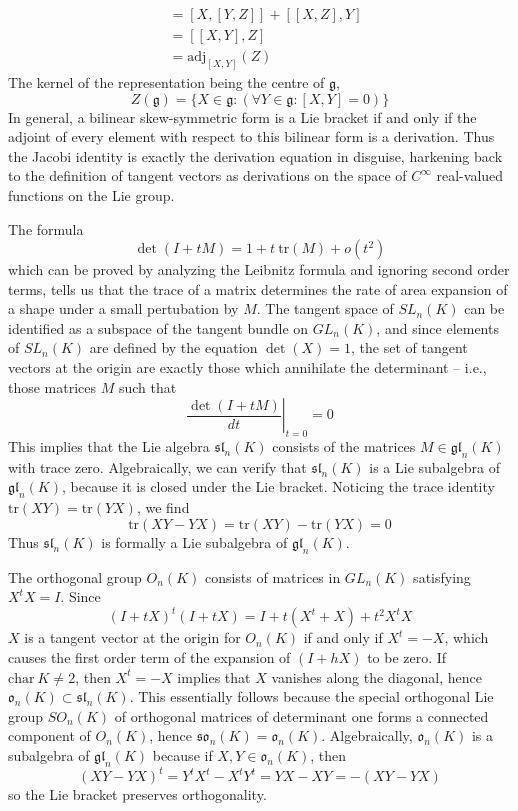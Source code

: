 \begin{example}
\begin{align*}
        &= [X,[Y,Z]] + [[X,Z],Y]\\
        &= [[X,Y],Z]\\
        &= \text{adj}_{[X,Y]}(Z)
    \end{align*}
    The kernel of the representation being the centre of $\mathfrak{g}$,
    \[ Z(\mathfrak{g}) = \{ X \in \mathfrak{g} : (\forall Y \in \mathfrak{g}: [X,Y] = 0) \} \]
    In general, a bilinear skew-symmetric form is a Lie bracket if and only if the adjoint of every element with respect to this bilinear form is a derivation. Thus the Jacobi identity is exactly the derivation equation in disguise, harkening back to the definition of tangent vectors as derivations on the space of $C^\infty$ real-valued functions on the Lie group.
\end{example}

\begin{example}
    The formula
    \[ \det(I + tM) = 1 + t\ \text{tr}(M) + o(t^2) \]
    which can be proved by analyzing the Leibnitz formula and ignoring second order terms, tells us that the trace of a matrix determines the rate of area expansion of a shape under a small pertubation by $M$. The tangent space of $SL_n(K)$ can be identified as a subspace of the tangent bundle on $GL_n(K)$, and since elements of $SL_n(K)$ are defined by the equation $\det(X) = 1$, the set of tangent vectors at the origin are exactly those which annihilate the determinant -- i.e., those matrices $M$ such that
    \[ \left. \frac{\det(I + tM)}{dt} \right|_{t = 0} = 0 \]
    This implies that the Lie algebra $\mathfrak{sl}_n(K)$ consists of the matrices $M \in \mathfrak{gl}_n(K)$ with trace zero. Algebraically, we can verify that $\mathfrak{sl}_n(K)$ is a Lie subalgebra of $\mathfrak{gl}_n(K)$, because it is closed under the Lie bracket. Noticing the trace identity $\text{tr}(XY) = \text{tr}(YX)$, we find
    \[ \text{tr}(XY - YX) = \text{tr}(XY) - \text{tr}(YX) = 0 \]
    Thus $\mathfrak{sl}_n(K)$ is formally a Lie subalgebra of $\mathfrak{gl}_n(K)$.
\end{example}

\begin{example}
    The orthogonal group $O_n(K)$ consists of matrices in $GL_n(K)$ satisfying $X^tX = I$. Since
    \[ (I + tX)^t(I + tX) = I + t(X^t + X) + t^2X^tX \]
    $X$ is a tangent vector at the origin for $O_n(K)$ if and only if $X^t = -X$, which causes the first order term of the expansion of $(I + hX)$ to be zero. If $\text{char}\ K \neq 2$, then $X^t = -X$ implies that $X$ vanishes along the diagonal, hence $\mathfrak{o}_n(K) \subset \mathfrak{sl}_n(K)$. This essentially follows because the special orthogonal Lie group $SO_n(K)$ of orthogonal matrices of determinant one forms a connected component of $O_n(K)$, hence $\mathfrak{so}_n(K) = \mathfrak{o}_n(K)$. Algebraically, $\mathfrak{o}_n(K)$ is a subalgebra of $\mathfrak{gl}_n(K)$ because if $X,Y \in \mathfrak{o}_n(K)$, then
    \[ (XY - YX)^t = Y^tX^t - X^tY^t = YX - XY = -(XY - YX) \]
    so the Lie bracket preserves orthogonality.
\end{example}

